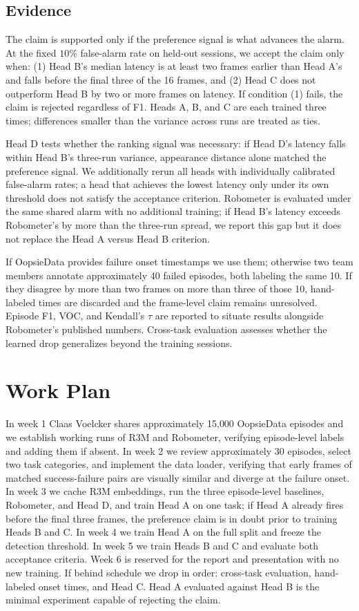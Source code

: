\documentclass{article}
\begin{document}
\subsection{Evidence}
The claim is supported only if the preference signal is what advances the alarm. At the fixed $10\%$ false-alarm rate on held-out sessions, we accept the claim only when: (1) Head B's median latency is at least two frames earlier than Head A's and falls before the final three of the 16 frames, and (2) Head C does not outperform Head B by two or more frames on latency. If condition (1) fails, the claim is rejected regardless of F1. Heads A, B, and C are each trained three times; differences smaller than the variance across runs are treated as ties.

Head D tests whether the ranking signal was necessary: if Head D's latency falls within Head B's three-run variance, appearance distance alone matched the preference signal. We additionally rerun all heads with individually calibrated false-alarm rates; a head that achieves the lowest latency only under its own threshold does not satisfy the acceptance criterion. Robometer is evaluated under the same shared alarm with no additional training; if Head B's latency exceeds Robometer's by more than the three-run spread, we report this gap but it does not replace the Head A versus Head B criterion.

If OopsieData provides failure onset timestamps we use them; otherwise two team members annotate approximately 40 failed episodes, both labeling the same 10. If they disagree by more than two frames on more than three of those 10, hand-labeled times are discarded and the frame-level claim remains unresolved. Episode F1, VOC, and Kendall's $\tau$ are reported to situate results alongside Robometer's published numbers. Cross-task evaluation assesses whether the learned drop generalizes beyond the training sessions.

\section{Work Plan}
In week 1 Claas Voelcker shares approximately 15{,}000 OopsieData episodes and we establish working runs of R3M and Robometer, verifying episode-level labels and adding them if absent. In week 2 we review approximately 30 episodes, select two task categories, and implement the data loader, verifying that early frames of matched success-failure pairs are visually similar and diverge at the failure onset. In week 3 we cache R3M embeddings, run the three episode-level baselines, Robometer, and Head D, and train Head A on one task; if Head A already fires before the final three frames, the preference claim is in doubt prior to training Heads B and C. In week 4 we train Head A on the full split and freeze the detection threshold. In week 5 we train Heads B and C and evaluate both acceptance criteria. Week 6 is reserved for the report and presentation with no new training. If behind schedule we drop in order: cross-task evaluation, hand-labeled onset times, and Head C. Head A evaluated against Head B is the minimal experiment capable of rejecting the claim.
\end{document}
